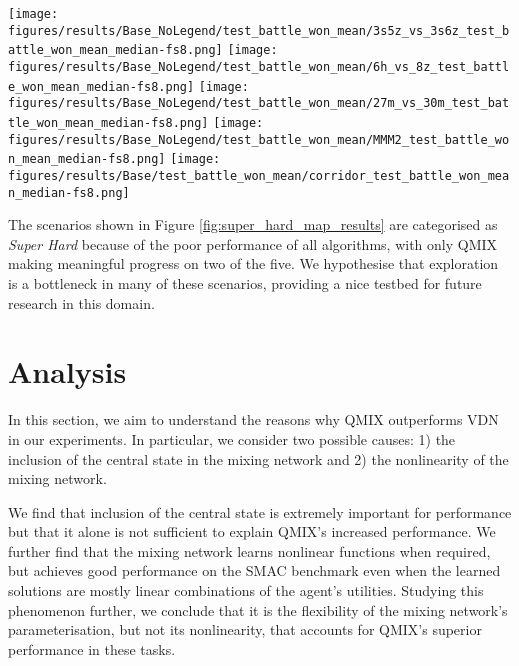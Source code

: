 \documentclass[twoside,11pt]{article}
\begin{document}
\begin{figure*}[h!]
	\centering
	\texttt{[image: figures/results/Base\_NoLegend/test\_battle\_won\_mean/3s5z\_vs\_3s6z\_test\_battle\_won\_mean\_median-fs8.png]}
	\texttt{[image: figures/results/Base\_NoLegend/test\_battle\_won\_mean/6h\_vs\_8z\_test\_battle\_won\_mean\_median-fs8.png]}
	\texttt{[image: figures/results/Base\_NoLegend/test\_battle\_won\_mean/27m\_vs\_30m\_test\_battle\_won\_mean\_median-fs8.png]}
	\texttt{[image: figures/results/Base\_NoLegend/test\_battle\_won\_mean/MMM2\_test\_battle\_won\_mean\_median-fs8.png]}
	\texttt{[image: figures/results/Base/test\_battle\_won\_mean/corridor\_test\_battle\_won\_mean\_median-fs8.png]}
	\caption{Super Hard scenarios. The heuristic AI's performance shown as a dotted black line.}
	\label{fig:super_hard_map_results}
\end{figure*}

The scenarios shown in Figure \ref{fig:super_hard_map_results} are categorised as \textit{Super Hard} because of the poor performance of all algorithms, with
only QMIX  making meaningful progress on two of the five.
We hypothesise that exploration is a bottleneck in many of these scenarios, providing a nice testbed for future research in this domain.



 \section{Analysis}
\label{sec:analysis}



In this section, we aim to understand the reasons why QMIX outperforms VDN in 
our experiments. In particular, we consider two possible causes: 1) the 
inclusion of the central state in the mixing network and 2) the nonlinearity of 
the mixing network.

We find that inclusion of the central state is extremely important for 
performance but that it alone is not sufficient to explain QMIX's increased 
performance.
We further find that the mixing network learns nonlinear functions when 
required, but achieves good performance on the SMAC benchmark even when the 
learned solutions are mostly linear combinations of the agent's utilities.
Studying this phenomenon further, we conclude that it is the flexibility of the 
mixing network's parameterisation, but not its nonlinearity, that accounts for 
QMIX's superior performance in these tasks.
\end{document}
